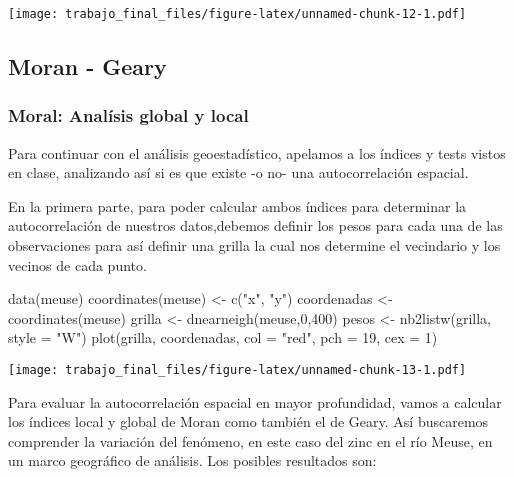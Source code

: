 \documentclass[
  12pt,
]{article}
\newenvironment{Shaded}{\begin{snugshade}}{\end{snugshade}}
\newcommand{\AttributeTok}[1]{\textcolor[rgb]{0.77,0.63,0.00}{#1}}
\newcommand{\DecValTok}[1]{\textcolor[rgb]{0.00,0.00,0.81}{#1}}
\newcommand{\FunctionTok}[1]{\textcolor[rgb]{0.00,0.00,0.00}{#1}}
\newcommand{\NormalTok}[1]{#1}
\newcommand{\OtherTok}[1]{\textcolor[rgb]{0.56,0.35,0.01}{#1}}
\newcommand{\StringTok}[1]{\textcolor[rgb]{0.31,0.60,0.02}{#1}}
\begin{document}
\texttt{[image: trabajo\_final\_files/figure-latex/unnamed-chunk-12-1.pdf]}

\hypertarget{moran---geary}{%
\subsection{Moran - Geary}\label{moran---geary}}

\hypertarget{moral-analuxedsis-global-y-local}{%
\subsubsection{Moral: Analísis global y
local}\label{moral-analuxedsis-global-y-local}}

Para continuar con el análisis geoestadístico, apelamos a los índices y
tests vistos en clase, analizando así si es que existe -o no- una
autocorrelación espacial.

En la primera parte, para poder calcular ambos índices para determinar
la autocorrelación de nuestros datos,debemos definir los pesos para cada
una de las observaciones para así definir una grilla la cual nos
determine el vecindario y los vecinos de cada punto.

\begin{Shaded}
\begin{Highlighting}[]
\FunctionTok{data}\NormalTok{(meuse)}
\FunctionTok{coordinates}\NormalTok{(meuse) }\OtherTok{\textless{}{-}} \FunctionTok{c}\NormalTok{(}\StringTok{"x"}\NormalTok{, }\StringTok{"y"}\NormalTok{)}
\NormalTok{coordenadas }\OtherTok{\textless{}{-}} \FunctionTok{coordinates}\NormalTok{(meuse)}
\NormalTok{grilla }\OtherTok{\textless{}{-}} \FunctionTok{dnearneigh}\NormalTok{(meuse,}\DecValTok{0}\NormalTok{,}\DecValTok{400}\NormalTok{)}
\NormalTok{pesos }\OtherTok{\textless{}{-}} \FunctionTok{nb2listw}\NormalTok{(grilla, }\AttributeTok{style =} \StringTok{"W"}\NormalTok{)}
\FunctionTok{plot}\NormalTok{(grilla, coordenadas, }\AttributeTok{col =} \StringTok{"red"}\NormalTok{, }\AttributeTok{pch =} \DecValTok{19}\NormalTok{, }\AttributeTok{cex =} \DecValTok{1}\NormalTok{)}
\end{Highlighting}
\end{Shaded}

\texttt{[image: trabajo\_final\_files/figure-latex/unnamed-chunk-13-1.pdf]}

Para evaluar la autocorrelación espacial en mayor profundidad, vamos a
calcular los índices local y global de Moran como también el de Geary.
Así buscaremos comprender la variación del fenómeno, en este caso del
zinc en el río Meuse, en un marco geográfico de análisis. Los posibles
resultados son:
\end{document}
